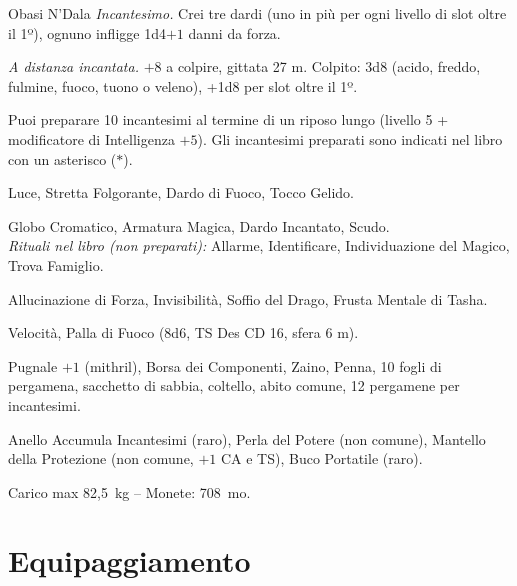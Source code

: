 \documentclass[letterpaper,twocolumn,openany,nodeprecatedcode,justified]{dndbook}
\begin{document}
\begin{DndMonster}{Obasi N'Dala}
  \textit{Incantesimo.} Crei tre dardi (uno in più per ogni livello di
  slot oltre il 1º), ognuno infligge 1d4$+1$ danni da forza.

  \textit{A distanza incantata.} $+8$ a colpire, gittata 27 m. Colpito:
  3d8 (acido, freddo, fulmine, fuoco, tuono o veleno), +1d8 per slot oltre
  il 1º.


  Puoi preparare 10 incantesimi al termine di un riposo lungo (livello 5 +
  modificatore di Intelligenza $+5$). Gli incantesimi preparati sono indicati
  nel libro con un asterisco ($\ast$).

  Luce, Stretta Folgorante, Dardo di Fuoco, Tocco Gelido.

  Globo Cromatico, Armatura Magica, Dardo Incantato, Scudo.\\
  \emph{Rituali nel libro (non preparati):} Allarme, Identificare,
  Individuazione del Magico, Trova Famiglio.

  Allucinazione di Forza, Invisibilità, Soffio del Drago, Frusta Mentale
  di Tasha.

  Velocità, Palla di Fuoco (8d6, TS Des CD 16, sfera 6 m).

  Pugnale $+1$ (mithril), Borsa dei Componenti, Zaino, Penna, 10 fogli di
  pergamena, sacchetto di sabbia, coltello, abito comune, 12 pergamene per
  incantesimi.

  Anello Accumula Incantesimi (raro), Perla del Potere (non comune),
  Mantello della Protezione (non comune, $+1$ CA e TS), Buco Portatile
  (raro).

  Carico max 82,5~kg -- Monete: 708~mo.
\end{DndMonster}

\chapter*{Equipaggiamento}
\end{document}
